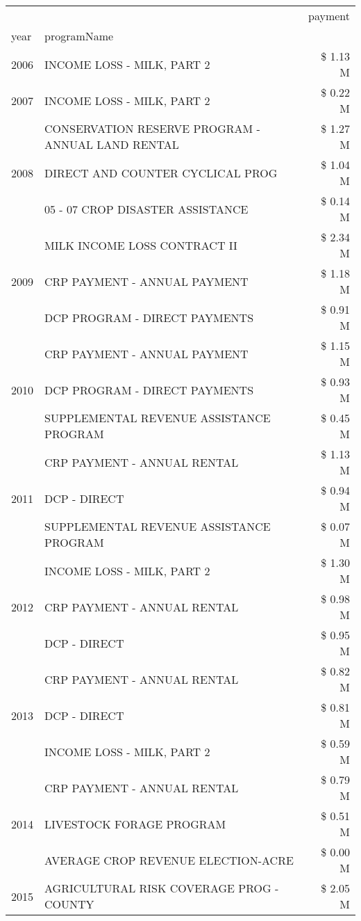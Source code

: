 \begin{tabular}{llr}
\toprule
 &  & payment \\
year & programName &  \\
\midrule
2006 & INCOME LOSS - MILK, PART 2 & \$ 1.13 M \\
\cline{1-3}
2007 & INCOME LOSS - MILK, PART 2 & \$ 0.22 M \\
\cline{1-3}
\multirow[t]{3}{*}{2008} & CONSERVATION RESERVE PROGRAM - ANNUAL LAND RENTAL & \$ 1.27 M \\
 & DIRECT AND COUNTER CYCLICAL PROG & \$ 1.04 M \\
 & 05 - 07 CROP DISASTER ASSISTANCE & \$ 0.14 M \\
\cline{1-3}
\multirow[t]{3}{*}{2009} & MILK INCOME LOSS CONTRACT II & \$ 2.34 M \\
 & CRP PAYMENT - ANNUAL PAYMENT & \$ 1.18 M \\
 & DCP PROGRAM - DIRECT PAYMENTS & \$ 0.91 M \\
\cline{1-3}
\multirow[t]{3}{*}{2010} & CRP PAYMENT - ANNUAL PAYMENT & \$ 1.15 M \\
 & DCP PROGRAM - DIRECT PAYMENTS & \$ 0.93 M \\
 & SUPPLEMENTAL REVENUE ASSISTANCE PROGRAM & \$ 0.45 M \\
\cline{1-3}
\multirow[t]{3}{*}{2011} & CRP PAYMENT - ANNUAL RENTAL & \$ 1.13 M \\
 & DCP - DIRECT & \$ 0.94 M \\
 & SUPPLEMENTAL REVENUE ASSISTANCE PROGRAM & \$ 0.07 M \\
\cline{1-3}
\multirow[t]{3}{*}{2012} & INCOME LOSS - MILK, PART 2 & \$ 1.30 M \\
 & CRP PAYMENT - ANNUAL RENTAL & \$ 0.98 M \\
 & DCP - DIRECT & \$ 0.95 M \\
\cline{1-3}
\multirow[t]{3}{*}{2013} & CRP PAYMENT - ANNUAL RENTAL & \$ 0.82 M \\
 & DCP - DIRECT & \$ 0.81 M \\
 & INCOME LOSS - MILK, PART 2 & \$ 0.59 M \\
\cline{1-3}
\multirow[t]{3}{*}{2014} & CRP PAYMENT - ANNUAL RENTAL & \$ 0.79 M \\
 & LIVESTOCK FORAGE PROGRAM & \$ 0.51 M \\
 & AVERAGE CROP REVENUE ELECTION-ACRE & \$ 0.00 M \\
\cline{1-3}
\multirow[t]{3}{*}{2015} & AGRICULTURAL RISK COVERAGE PROG - COUNTY & \$ 2.05 M \\

\end{tabular}

